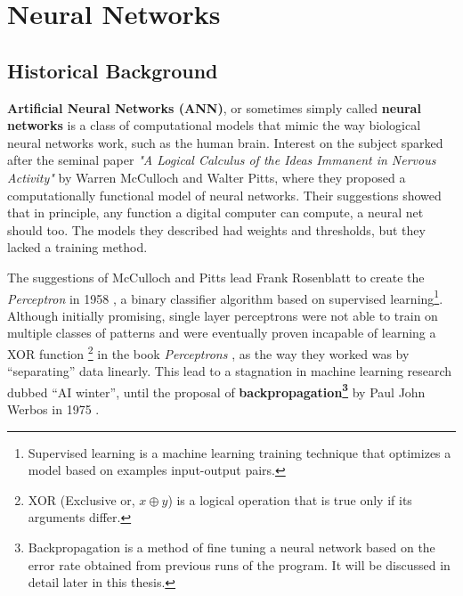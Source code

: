 \chapter{Neural Networks} \label{literature}



\section{Historical Background}

\textbf{Artificial Neural Networks (ANN)}, or sometimes simply called
\textbf{neural networks} is a class of computational models that mimic
the way biological neural networks work, such as the human brain. Interest
on the subject sparked after the seminal paper \textit{"A Logical
Calculus of the Ideas Immanent in Nervous Activity"}
\cite{article:McCulloch1943} by Warren McCulloch and Walter Pitts, where
they proposed a computationally functional model of neural networks.
Their suggestions showed that in principle, any function a digital computer
can compute, a neural net should too. The models they described had weights
and thresholds, but they lacked a training method. 

The suggestions of McCulloch and Pitts lead Frank Rosenblatt to create
the \textit{Perceptron} in 1958 \cite{article:Rosenblatt1958ThePA}, a
binary classifier algorithm based on supervised
learning\footnote{Supervised learning is a machine learning training
technique that optimizes a model based on examples input-output
pairs.}. Although initially promising, single layer perceptrons were
not able to train on multiple classes of patterns and were eventually
proven incapable of learning a XOR function \footnote{XOR (Exclusive
or, $x\oplus y$) is a logical operation that is true only if its
arguments differ.} in the book \textit{Perceptrons}
\cite{book:minsky1969perceptrons}, as the way they worked was by
``separating'' data linearly. This lead to a stagnation in machine
learning research dubbed ``AI winter'', until the proposal of
\textbf{backpropagation\footnote{Backpropagation is a method of fine
tuning a neural network based on the error rate obtained from previous
runs of the program. It will be discussed in detail later in this
thesis.}} by Paul John Werbos in 1975 \cite{book:werbos1975beyond}.

